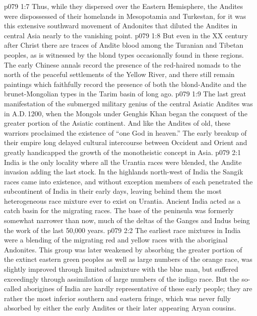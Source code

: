 \vs p079 1:7 Thus, while they dispersed over the Eastern Hemisphere, the Andites were dispossessed of their homelands in Mesopotamia and Turkestan, for it was this extensive southward movement of Andonites that diluted the Andites in central Asia nearly to the vanishing point.
\vs p079 1:8 But even in the XX century after Christ there are traces of Andite blood among the Turanian and Tibetan peoples, as is witnessed by the blond types occasionally found in these regions. The early Chinese annals record the presence of the red\hyp{}haired nomads to the north of the peaceful settlements of the Yellow River, and there still remain paintings which faithfully record the presence of both the blond\hyp{}Andite and the brunet\hyp{}Mongolian types in the Tarim basin of long ago.
\vs p079 1:9 The last great manifestation of the submerged military genius of the central Asiatic Andites was in A.D.\,1200, when the Mongols under Genghis Khan began the conquest of the greater portion of the Asiatic continent. And like the Andites of old, these warriors proclaimed the existence of “one God in heaven.” The early breakup of their empire long delayed cultural intercourse between Occident and Orient and greatly handicapped the growth of the monotheistic concept in Asia.
\vs p079 2:1 India is the only locality where all the Urantia races were blended, the Andite invasion adding the last stock. In the highlands north\hyp{}west of India the Sangik races came into existence, and without exception members of each penetrated the subcontinent of India in their early days, leaving behind them the most heterogeneous race mixture ever to exist on Urantia. Ancient India acted as a catch basin for the migrating races. The base of the peninsula was formerly somewhat narrower than now, much of the deltas of the Ganges and Indus being the work of the last 50,000 years.
\vs p079 2:2 The earliest race mixtures in India were a blending of the migrating red and yellow races with the aboriginal Andonites. This group was later weakened by absorbing the greater portion of the extinct eastern green peoples as well as large numbers of the orange race, was slightly improved through limited admixture with the blue man, but suffered exceedingly through assimilation of large numbers of the indigo race. But the so\hyp{}called aborigines of India are hardly representative of these early people; they are rather the most inferior southern and eastern fringe, which was never fully absorbed by either the early Andites or their later appearing Aryan cousins.
